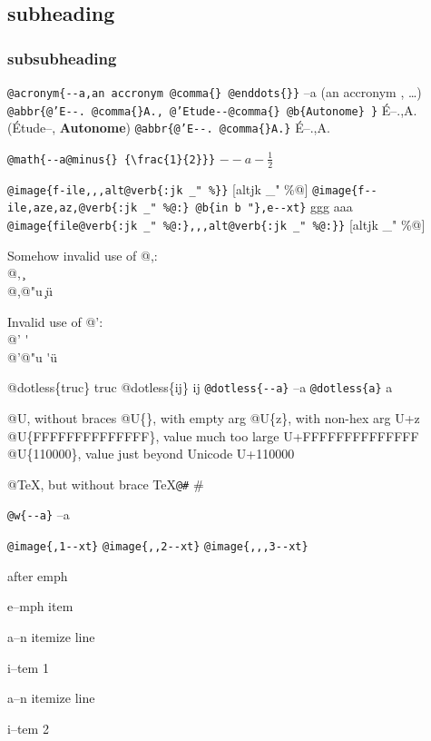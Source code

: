 \documentclass{book}
\begin{document}
\subsection*{subheading}

\subsubsection*{subsubheading}

\texttt{@acronym\{{-}{-}a,an accronym @comma\{\} @enddots\{\}\}} --a (an accronym , \dots{})
\texttt{@abbr\{@'E{-}{-}. @comma\{\}A., @'Etude{-}{-}@comma\{\} @b\{Autonome\} \}} \'{E}--.\@ ,A.\@ (\'{E}tude--, \textbf{Autonome})
\texttt{@abbr\{@'E{-}{-}. @comma\{\}A.\}} \'{E}--.\@ ,A.\@


\texttt{@math\{{-}{-}a@minus\{\} \{\textbackslash{}frac\{1\}\{2\}\}\}} $--a- {\frac{1}{2}}$


\texttt{@image\{f-ile,,,alt@verb\{:jk \_" \%\@\}\}} [altjk \_" \%@]
\texttt{@image\{f{-}{-}ile,aze,az,@verb\{:jk \_" \%@:\} @b\{in b "\},e{-}{-}xt\}} ggg
aaa
\texttt{@image\{file@verb\{:jk \_" \%@:\},,,alt@verb\{:jk \_" \%@:\}\}} [altjk \_" \%@]


Somehow invalid use of @,:\leavevmode{}\\
@, \c{}
\leavevmode{}\\
@,@"u \c{}\"{u}


Invalid use of @':\leavevmode{}\\
@' \'{}
\leavevmode{}\\
@'@"u \'{}\"{u}


@dotless\{truc\} truc
@dotless\{ij\} ij
\texttt{@dotless\{{-}{-}a\}} --a
\texttt{@dotless\{a\}} a


@U, without braces @U\{\}, with empty arg 
@U\{z\}, with non-hex arg U+z
@U\{FFFFFFFFFFFFFF\}, value much too large U+FFFFFFFFFFFFFF
@U\{110000\}, value just beyond Unicode U+110000


@TeX, but without brace \TeX{}\texttt{@\#} \#


\texttt{@w\{{-}{-}a\}} \hbox{--a}


\texttt{@image\{,1{-}{-}xt\}} 
\texttt{@image\{,,2{-}{-}xt\}} 
\texttt{@image\{,,,3{-}{-}xt\}} 


\emph{} after emph 

e--mph item


\textbullet{} a--n itemize line 

i--tem 1


\textbullet{} a--n itemize line 

i--tem 2
\end{document}
